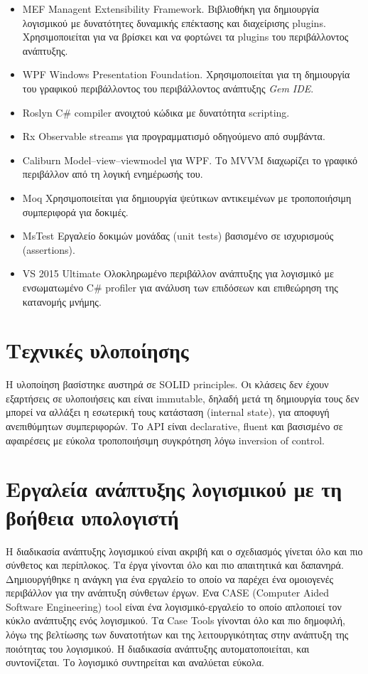 \begin{itemize}
	\item{MEF} Managent Extensibility Framework. Βιβλιοθήκη για δημιουργία λογισμικού με δυνατότητες δυναμικής επέκτασης και διαχείρισης plugins. Χρησιμοποιείται για να βρίσκει και να φορτώνει τα plugins του περιβάλλοντος ανάπτυξης.
	\item{WPF} Windows Presentation Foundation. Χρησιμοποιείται για τη δημιουργία του γραφικού περιβάλλοντος του περιβάλλοντος ανάπτυξης \textit{Gem IDE}.
	\item{Roslyn} C\# compiler ανοιχτού κώδικα με δυνατότητα scripting.
	\item{Rx} Observable streams για προγραμματισμό οδηγούμενο από συμβάντα.
	\item{Caliburn} Model–view–viewmodel για WPF. Το MVVM διαχωρίζει το γραφικό περιβάλλον από τη λογική ενημέρωσής του.
	\item{Moq} Χρησιμοποιείται για δημιουργία ψεύτικων αντικειμένων με τροποποιήσιμη συμπεριφορά για δοκιμές.
	\item{MsTest} Εργαλείο δοκιμών μονάδας (unit tests) βασισμένο σε ισχυρισμούς (assertions).
	\item{VS 2015 Ultimate} Ολοκληρωμένο περιβάλλον ανάπτυξης για λογισμικό με ενσωματωμένο C\# profiler για ανάλυση των επιδόσεων και επιθεώρηση της κατανομής μνήμης.
\end{itemize}

\section{Τεχνικές υλοποίησης}
Η υλοποίηση βασίστηκε αυστηρά σε \gls{SOLID} principles. Οι κλάσεις δεν έχουν εξαρτήσεις σε υλοποιήσεις και είναι immutable, δηλαδή μετά τη δημιουργία τους δεν μπορεί να αλλάξει η εσωτερική τους κατάσταση (internal state), για αποφυγή ανεπιθύμητων συμπεριφορών. Το \gls{API} είναι declarative, fluent και βασισμένο σε αφαιρέσεις με εύκολα τροποποιήσιμη συγκρότηση λόγω inversion of control.

\section{Εργαλεία ανάπτυξης λογισμικού με τη βοήθεια υπολογιστή}
Η διαδικασία ανάπτυξης λογισμικού είναι ακριβή και ο σχεδιασμός γίνεται όλο και πιο σύνθετος και περίπλοκος. Τα έργα γίνονται όλο και πιο απαιτητικά και δαπανηρά. Δημιουργήθηκε η ανάγκη για ένα εργαλείο το οποίο να παρέχει ένα ομοιογενές περιβάλλον για την ανάπτυξη σύνθετων έργων. 
Ένα CASE (Computer Aided Software Engineering) tool είναι ένα λογισμικό-εργαλείο το οποίο απλοποιεί τον κύκλο ανάπτυξης ενός λογισμικού. Τα Case Tools γίνονται όλο και πιο δημοφιλή, λόγω της βελτίωσης των δυνατοτήτων και της λειτουργικότητας στην ανάπτυξη της ποιότητας του λογισμικού. Η διαδικασία ανάπτυξης αυτοματοποιείται, και συντονίζεται. Το λογισμικό συντηρείται και αναλύεται εύκολα. 

